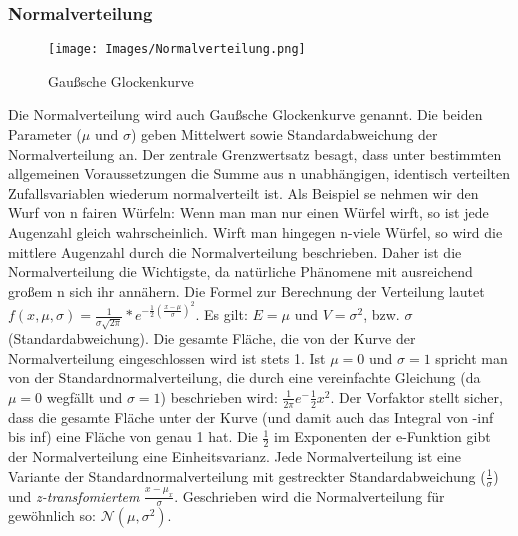 \documentclass{scrreprt}
\begin{document}
\subsubsection{Normalverteilung}\label{Normalverteilung}
\begin{wrapfigure}{r}{0.5\textwidth}
    \centering
    \texttt{[image: Images/Normalverteilung.png]}
    \caption{Gaußsche Glockenkurve}
    \label{Figur 6}
\end{wrapfigure}
Die Normalverteilung wird auch Gaußsche Glockenkurve genannt. Die beiden Parameter ($\mu$  und $\sigma$) geben Mittelwert sowie Standardabweichung der Normalverteilung an. Der zentrale Grenzwertsatz besagt, dass unter bestimmten allgemeinen Voraussetzungen die Summe aus n unabhängigen, identisch verteilten Zufallsvariablen wiederum normalverteilt ist. Als Beispiel se nehmen wir den Wurf von n fairen Würfeln: Wenn man man nur einen Würfel wirft, so ist jede Augenzahl gleich wahrscheinlich. Wirft man hingegen n-viele Würfel, so wird die mittlere Augenzahl durch die Normalverteilung beschrieben. Daher ist die Normalverteilung die Wichtigste, da natürliche Phänomene mit ausreichend großem n sich ihr annähern. Die Formel zur Berechnung der Verteilung lautet \textit{$f(x,\mu, \sigma)=\frac{1}{\sigma\sqrt{2\pi}}*e^{-\frac{1}{2}(\frac{x-\mu}{\sigma})^2}$}. Es gilt: $E=\mu$ und $V=\sigma^2$, bzw. $\sigma$ (Standardabweichung). Die gesamte Fläche, die von der Kurve der Normalverteilung eingeschlossen wird ist stets 1. Ist $\mu=0$ und $\sigma=1$ spricht man von der Standardnormalverteilung, die durch eine vereinfachte Gleichung (da $\mu=0$ wegfällt und $\sigma=1$) beschrieben wird: $\frac{1}{2\pi}e^-\frac{1}{2}x^2$. Der Vorfaktor stellt sicher, dass die gesamte Fläche unter der Kurve (und damit auch das Integral von -inf bis inf) eine Fläche von genau 1 hat. Die $\frac{1}{2}$ im Exponenten der e-Funktion gibt der Normalverteilung eine Einheitsvarianz. Jede Normalverteilung ist eine Variante der Standardnormalverteilung mit gestreckter Standardabweichung ($\frac{1}{\sigma}$) und \textit{z-transfomiertem} $\frac{x-\mu_x}{\sigma}$. Geschrieben wird die Normalverteilung für gewöhnlich so: $\mathcal{N}(\mu, \sigma^2)$. 
\end{document}
